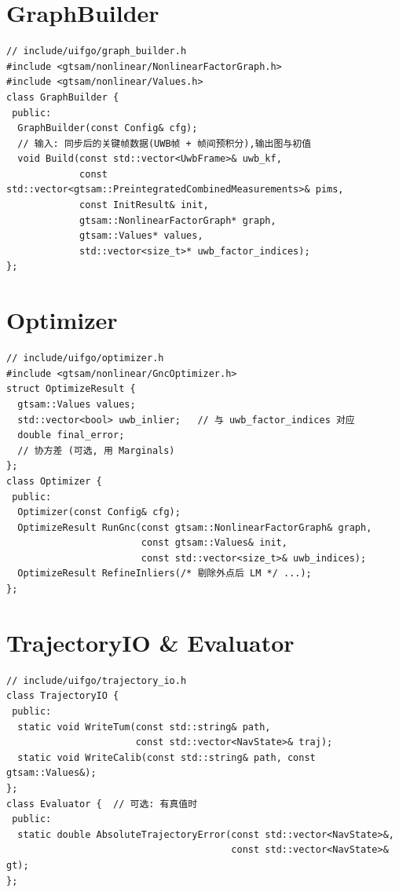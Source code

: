 \documentclass[11pt,a4paper]{report}
\begin{document}
\section{GraphBuilder}
\begin{lstlisting}[style=cpp]
// include/uifgo/graph_builder.h
#include <gtsam/nonlinear/NonlinearFactorGraph.h>
#include <gtsam/nonlinear/Values.h>
class GraphBuilder {
 public:
  GraphBuilder(const Config& cfg);
  // 输入: 同步后的关键帧数据(UWB帧 + 帧间预积分),输出图与初值
  void Build(const std::vector<UwbFrame>& uwb_kf,
             const std::vector<gtsam::PreintegratedCombinedMeasurements>& pims,
             const InitResult& init,
             gtsam::NonlinearFactorGraph* graph,
             gtsam::Values* values,
             std::vector<size_t>* uwb_factor_indices);
};
\end{lstlisting}

\section{Optimizer}
\begin{lstlisting}[style=cpp]
// include/uifgo/optimizer.h
#include <gtsam/nonlinear/GncOptimizer.h>
struct OptimizeResult {
  gtsam::Values values;
  std::vector<bool> uwb_inlier;   // 与 uwb_factor_indices 对应
  double final_error;
  // 协方差 (可选, 用 Marginals)
};
class Optimizer {
 public:
  Optimizer(const Config& cfg);
  OptimizeResult RunGnc(const gtsam::NonlinearFactorGraph& graph,
                        const gtsam::Values& init,
                        const std::vector<size_t>& uwb_indices);
  OptimizeResult RefineInliers(/* 剔除外点后 LM */ ...);
};
\end{lstlisting}

\section{TrajectoryIO \& Evaluator}
\begin{lstlisting}[style=cpp]
// include/uifgo/trajectory_io.h
class TrajectoryIO {
 public:
  static void WriteTum(const std::string& path,
                       const std::vector<NavState>& traj);
  static void WriteCalib(const std::string& path, const gtsam::Values&);
};
class Evaluator {  // 可选: 有真值时
 public:
  static double AbsoluteTrajectoryError(const std::vector<NavState>&,
                                        const std::vector<NavState>& gt);
};
\end{lstlisting}
\end{document}
